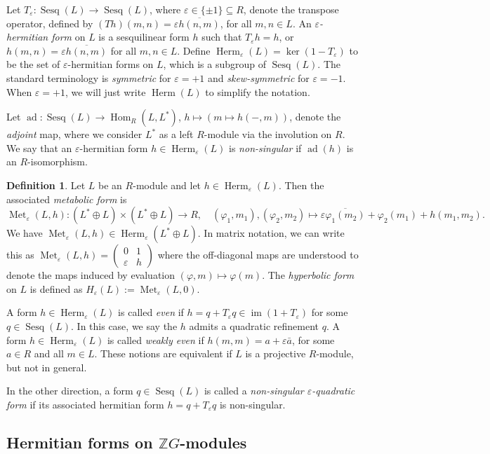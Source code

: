 \documentclass[11pt,a4paper,leqno]{amsart}
\theoremstyle{definition}
\newtheorem{definition}[theorem]{Definition}
\theoremstyle{remark}
\newcommand{\Z}{\mathbb{Z}}
\newcommand{\ol}{\overline}
\DeclareMathOperator{\Hom}{Hom}
\DeclareMathOperator{\IM}{im}
\DeclareMathOperator{\Sesq}{Sesq}
\DeclareMathOperator{\Herm}{Herm}
\DeclareMathOperator{\Met}{Met}
\newcommand{\ep}{\varepsilon}
\DeclareMathOperator{\ad}{ad}
\begin{document}
Let $T_\ep\colon \Sesq(L) \to \Sesq(L)$, where $\ep \in \{\pm 1\} \subseteq R$, denote the transpose operator, defined by $(Th)(m,n) = \ep \ol{h(n,m)}$, for all $m, n \in L$.
An \textit{$\ep$-hermitian form} on $L$ is a sesquilinear form $h$ such that $T_\ep h = h$, or  $h(m,n) = \ep\ol{h(n,m)}$ for all $m,n \in L$. Define $\Herm_\ep(L) = \ker(1-T_\ep)$ to be the set of $\ep$-hermitian forms on $L$, which is a subgroup of $\Sesq(L)$. The standard terminology is \emph{symmetric} for $\ep = +1$ and \emph{skew-symmetric} for $\ep = -1$.
When $\ep = +1$, we will just write  $\Herm(L)$ to simplify the notation.

Let $\ad\colon \Sesq(L) \to \Hom_R (L,L^*)$, $h \mapsto (m \mapsto h(-,m))$, 
denote the \emph{adjoint} map, where we consider  $L^*$ as a left  $R$-module via the involution on $R$.
We say that an  $\ep$-hermitian form $h \in \Herm_\ep(L)$ is \textit{non-singular} if $\ad(h)$ is an $R$-isomorphism.  

\begin{definition}\label{def:meta}
Let $L$ be an $R$-module and let $h \in \Herm_\ep(L)$. Then the associated \textit{metabolic form} is
\[ \Met_\ep (L,h)\colon (L^* \oplus L) \times (L^* \oplus L) \to R, \quad (\varphi_1,m_1),(\varphi_2,m_2) \mapsto \ep\ol{\varphi_1(m_2)} + \varphi_2(m_1)+h(m_1,m_2). \]
We have $\Met_\ep (L,h) \in \Herm_\ep(L^* \oplus L)$.
In matrix notation, we can write this as $\Met_\ep(L,h) = \left(\begin{smallmatrix} 0 & 1 \\ \ep & h \end{smallmatrix}\right)$ where the off-diagonal maps are understood to denote the maps induced by evaluation $(\varphi, m) \mapsto \varphi(m)$.
The \textit{hyperbolic form} on $L$ is defined as $H_\ep(L) := \Met_\ep (L,0)$.
\end{definition}

A form $ h \in \Herm_\ep(L)$ is called \emph{even} if $h = q + T_\ep q \in \IM(1+T_\ep)$ for some $q \in \Sesq(L)$. In this case, we say the $h$ admits a quadratic refinement $q$. A form $h \in  \Herm_\ep(L)$ is called \emph{weakly even} if $h(m,m) = a + \ep\bar a$, for some $a \in R$ and all $m \in L$. These notions are equivalent if $L$ is a projective $R$-module, but not in general. 

In the other direction,  a form  $q \in \Sesq(L)$ is called a \emph{non-singular $\ep$-quadratic form} if its associated hermitian form 
$h = q + T_\ep q$ is non-singular.

\subsection{Hermitian forms on $\Z G$-modules} \label{ss:Herm-ZG}
\end{document}
